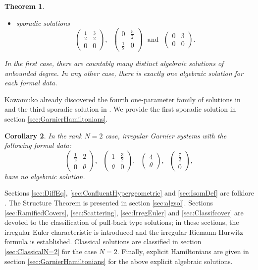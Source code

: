 \documentclass[12]{amsart}
\newtheorem{thm}{Theorem}
\newtheorem{cor}[thm]{Corollary}
\begin{document}
\begin{thm}
\begin{itemize}
$$\begin{pmatrix}0&1&1\\ 0&\theta&-\theta\end{pmatrix}$$
\item sporadic solutions
$$\begin{pmatrix}\frac{1}{2}&\frac{3}{2}\\ 0&0\end{pmatrix},\ \ \ 
\begin{pmatrix}0&\frac{5}{2}\\ \frac{1}{2}&0\end{pmatrix}\ \ \ \text{and}\ \ \ 
\begin{pmatrix}0&3\\ 0&0\end{pmatrix}.$$
\end{itemize}
In the first case, there are countably many distinct algebraic solutions of unbounded
degree. In any other case, there is exactly one algebraic solution for each formal data.
\end{thm}
Kawamuko already discovered the fourth one-parameter family of solutions in \cite{KawamukoAlg}
and the third sporadic solution in \cite{KawamukoRat}. We provide the first sporadic solution 
in section \ref{sec:GarnierHamiltonians}.

\begin{cor}In the rank $N=2$ case, irregular Garnier systems with the following formal data: 
$$\begin{pmatrix}\frac{1}{2}&2\\ 0&\theta\end{pmatrix},\ \ \ 
\begin{pmatrix}1&\frac{3}{2}\\ \theta&0\end{pmatrix},\ \ \ 
\begin{pmatrix}4\\ \theta\end{pmatrix},\ \ \ 
\begin{pmatrix}\frac{7}{2}\\ 0\end{pmatrix},$$
have no algebraic solution.
\end{cor}


Sections \ref{sec:DiffEq}, \ref{sec:ConfluentHypergeometric} and \ref{sec:IsomDef} are folklore \cite{MR,MRGalois,Krichever,BMM,vdPS}. The Structure Theorem is presented in section \ref{sec:algsol}.
Sections \ref{sec:RamifiedCovers}, \ref{sec:Scattering}, \ref{sec:IrregEuler} and \ref{sec:Classifcover} are devoted 
to the classification of pull-back type solutions; in these sections, the irregular Euler characteristic is introduced and the 
irregular Riemann-Hurwitz formula is established. Classical solutions are classified in section \ref{sec:ClassicalN=2}
for the case $N=2$. Finally, explicit Hamiltonians are given in section \ref{sec:GarnierHamiltonians} for the above explicit
algebraic solutions.
\end{document}
